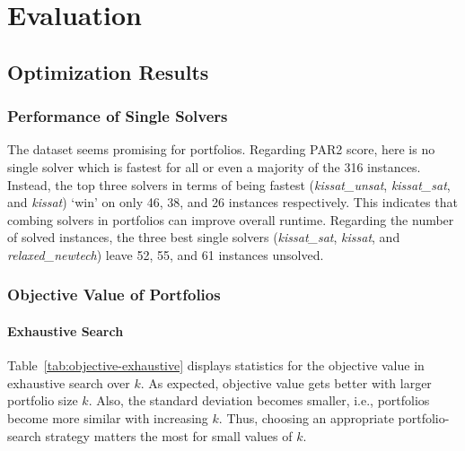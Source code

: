 \documentclass[conference]{IEEEtran}
\begin{document}
\section{Evaluation}
\label{sec:evaluation}

\subsection{Optimization Results}

\subsubsection{Performance of Single Solvers}

The dataset seems promising for portfolios.
Regarding PAR2 score, here is no single solver which is fastest for all or even a majority of the 316 instances.
Instead, the top three solvers in terms of being fastest (\emph{kissat\_unsat}, \emph{kissat\_sat}, and \emph{kissat}) `win' on only 46, 38, and 26 instances respectively.
This indicates that combing solvers in portfolios can improve overall runtime.
Regarding the number of solved instances, the three best single solvers (\emph{kissat\_sat}, \emph{kissat}, and \emph{relaxed\_newtech}) leave 52, 55, and 61 instances unsolved.

\subsubsection{Objective Value of Portfolios}

\paragraph{Exhaustive Search}

Table~\ref{tab:objective-exhaustive} displays statistics for the objective value in exhaustive search over $k$.
As expected, objective value gets better with larger portfolio size $k$.
Also, the standard deviation becomes smaller, i.e., portfolios become more similar with increasing $k$.
Thus, choosing an appropriate portfolio-search strategy matters the most for small values of $k$.
\end{document}
